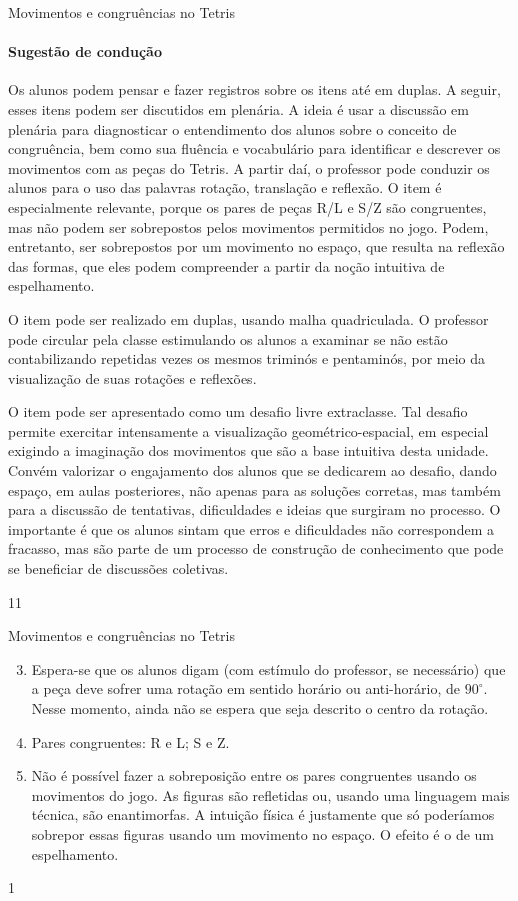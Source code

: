 \begin{sugestions}{Movimentos e congruências no Tetris}
{
\paragraph{Sugestão de condução}

Os alunos podem pensar e fazer registros sobre os itens  até  em duplas. A seguir, esses itens podem ser discutidos em plenária. A ideia é usar a discussão em plenária para diagnosticar o entendimento dos alunos sobre o conceito de congruência, bem como sua fluência e vocabulário para identificar e descrever os movimentos com as peças do Tetris. A partir daí, o professor pode conduzir os alunos para o uso das palavras rotação, translação e reflexão. O item  é especialmente relevante, porque os pares de peças R/L e S/Z são congruentes, mas não podem ser sobrepostos pelos movimentos permitidos no jogo. Podem, entretanto, ser sobrepostos por um movimento no espaço, que resulta na reflexão das formas, que eles podem compreender a partir da noção intuitiva de espelhamento. 

O item  pode ser realizado em duplas, usando malha quadriculada. O professor pode circular pela classe estimulando os alunos a examinar se não estão contabilizando repetidas vezes os mesmos triminós e pentaminós, por meio da visualização de suas rotações e reflexões. 

O item  pode ser apresentado como um desafio livre extraclasse. Tal desafio permite exercitar intensamente a visualização geométrico-espacial, em especial exigindo a imaginação dos movimentos que são a base intuitiva desta unidade. Convém valorizar o engajamento dos alunos que se dedicarem ao desafio, dando espaço, em aulas posteriores, não apenas para as soluções corretas, mas também para a discussão de tentativas, dificuldades e ideias que surgiram no processo. O importante é que os alunos sintam que erros e dificuldades não correspondem a fracasso, mas são parte de um processo de construção de conhecimento que pode se beneficiar de discussões coletivas.
}{1}{1}
\end{sugestions}
\begin{answer}{Movimentos e congruências no Tetris}
{
\begin{enumerate}\setcounter{enumi}{2}
\item Espera-se que os alunos digam (com estímulo do professor, se necessário) que a peça deve sofrer uma rotação em sentido horário ou anti-horário, de $90^{\circ}$. Nesse momento, ainda não se espera que seja descrito o centro da rotação. 
\item Pares congruentes: R e L; S e Z.
\item Não é possível fazer a sobreposição entre os pares congruentes usando os movimentos do jogo. As figuras são refletidas ou, usando uma linguagem mais técnica, são enantimorfas. A intuição física é justamente que só poderíamos sobrepor essas figuras usando um movimento no espaço. O efeito é o de um espelhamento. 
\end{enumerate}
}{1}
\end{answer}
